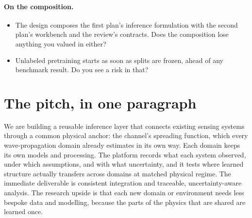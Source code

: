 \documentclass[11pt,a4paper]{article}
\begin{document}
\paragraph{On the composition.}
\begin{itemize}
\item The design composes the first plan's inference formulation with the second plan's workbench and the review's contracts. Does the composition lose anything you valued in either?
\item Unlabeled pretraining starts as soon as splits are frozen, ahead of any benchmark result. Do you see a risk in that?
\end{itemize}

\section{The pitch, in one paragraph}

We are building a reusable inference layer that connects existing sensing systems through a common physical anchor: the channel's spreading function, which every wave-propagation domain already estimates in its own way. Each domain keeps its own models and processing. The platform records what each system observed, under which assumptions, and with what uncertainty, and it tests where learned structure actually transfers across domains at matched physical regime. The immediate deliverable is consistent integration and traceable, uncertainty-aware analysis. The research upside is that each new domain or environment needs less bespoke data and modelling, because the parts of the physics that are shared are learned once.

\clearpage


\end{document}
